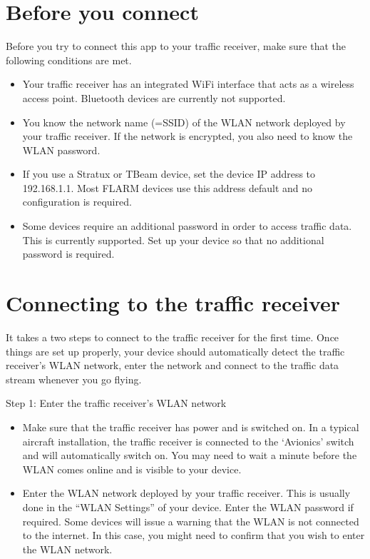 \documentclass[letterpaper,10pt,english]{sphinxmanual}
\begin{document}
\section{Before you connect}
\label{\detokenize{02-steps/traffic:before-you-connect}}
\sphinxAtStartPar
Before you try to connect this app to your traffic receiver, make sure that the
following conditions are met.
\begin{itemize}
\item {} 
\sphinxAtStartPar
Your traffic receiver has an integrated Wi\sphinxhyphen{}Fi interface that acts as a
wireless access point. Bluetooth devices are currently not supported.

\item {} 
\sphinxAtStartPar
You know the network name (=SSID) of the WLAN network deployed by your traffic
receiver. If the network is encrypted, you also need to know the WLAN
password.

\item {} 
\sphinxAtStartPar
If you use a Stratux or T\sphinxhyphen{}Beam device, set the device IP address to
192.168.1.1.  Most FLARM devices use this address default and  no
configuration is required.

\item {} 
\sphinxAtStartPar
Some devices require an additional password in order to access traffic
data. This is currently  supported. Set up your device so that no
additional password is required.

\end{itemize}


\section{Connecting to the traffic receiver}
\label{\detokenize{02-steps/traffic:connecting-to-the-traffic-receiver}}
\sphinxAtStartPar
It takes a two steps to connect  to the traffic
receiver for the first time. Once things are set up properly, your device should
automatically detect the traffic receiver’s WLAN network, enter the network and
connect to the traffic data stream whenever you go flying.

\sphinxAtStartPar
Step 1: Enter the traffic receiver’s WLAN network
\begin{itemize}
\item {} 
\sphinxAtStartPar
Make sure that the traffic receiver has power and is switched on. In a typical
aircraft installation, the traffic receiver is connected to the ‘Avionics’
switch and will automatically switch on. You may need to wait a minute before
the WLAN comes online and is visible to your device.

\item {} 
\sphinxAtStartPar
Enter the WLAN network deployed by your traffic receiver. This is usually done
in the “WLAN Settings” of your device. Enter the WLAN password if
required. Some devices will issue a warning that the WLAN is not connected to
the internet. In this case, you might need to confirm that you wish to enter
the WLAN network.

\end{itemize}
\end{document}
